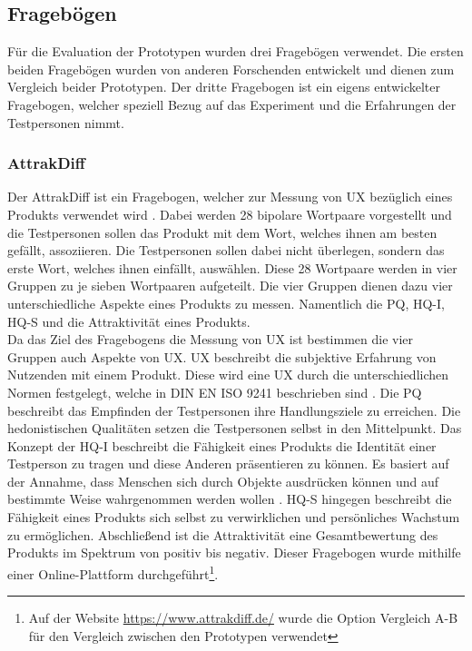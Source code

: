 \subsection{Fragebögen}
Für die Evaluation der Prototypen wurden drei Fragebögen verwendet.
Die ersten beiden Fragebögen wurden von anderen Forschenden entwickelt und dienen zum Vergleich beider Prototypen.
Der dritte Fragebogen ist ein eigens entwickelter Fragebogen, welcher speziell Bezug auf das Experiment und die Erfahrungen der Testpersonen nimmt.\\

\subsubsection{AttrakDiff}
Der AttrakDiff ist ein Fragebogen, welcher zur Messung von \ac{UX} bezüglich eines Produkts verwendet wird \cite{attrakdiff-2000, attrakdiff-2003, attrakdiff-2008}.
Dabei werden 28 bipolare Wortpaare vorgestellt und die Testpersonen sollen das Produkt mit dem Wort, welches ihnen am besten gefällt, assoziieren.
Die Testpersonen sollen dabei nicht überlegen, sondern das erste Wort, welches ihnen einfällt, auswählen.
Diese 28 Wortpaare werden in vier Gruppen zu je sieben Wortpaaren aufgeteilt.
Die vier Gruppen dienen dazu vier unterschiedliche Aspekte eines Produkts zu messen.
Namentlich die \ac{PQ}, \ac{HQ-I}, \ac{HQ-S} und die Attraktivität eines Produkts.\\

Da das Ziel des Fragebogens die Messung von \ac{UX} ist bestimmen die vier Gruppen auch Aspekte von \ac{UX}.
\ac{UX} beschreibt die subjektive Erfahrung von Nutzenden mit einem Produkt.
Diese wird eine \ac{UX} durch die unterschiedlichen Normen festgelegt, welche in DIN EN ISO 9241 beschrieben sind \cite{iso9241}.
Die \ac{PQ} beschreibt das Empfinden der Testpersonen ihre Handlungsziele zu erreichen.
Die hedonistischen Qualitäten setzen die Testpersonen selbst in den Mittelpunkt.
Das Konzept der \ac{HQ-I} beschreibt die Fähigkeit eines Produkts die Identität einer Testperson zu tragen und diese Anderen präsentieren zu können.
Es basiert auf der Annahme, dass Menschen sich durch Objekte ausdrücken können und auf bestimmte Weise wahrgenommen werden wollen \cite{prentice}.
\ac{HQ-S} hingegen beschreibt die Fähigkeit eines Produkts sich selbst zu verwirklichen und persönliches Wachstum zu ermöglichen.
Abschließend ist die Attraktivität eine Gesamtbewertung des Produkts im Spektrum von positiv bis negativ.
Dieser Fragebogen wurde mithilfe einer Online-Plattform durchgeführt\footnote{Auf der Website \url{https://www.attrakdiff.de/} wurde die Option \glqq Vergleich A-B\grqq{} für den Vergleich zwischen den Prototypen verwendet}.

